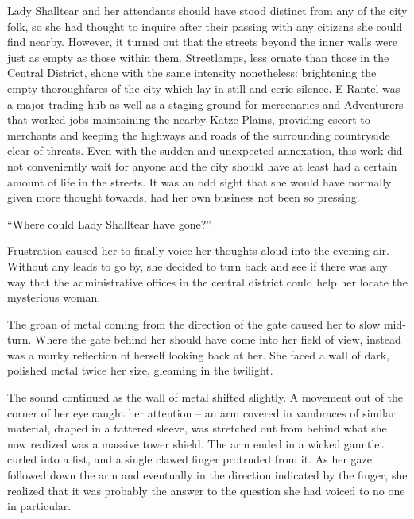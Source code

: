  

Lady Shalltear and her attendants should have stood distinct from any of the city folk, so she had thought to inquire after their passing with any citizens she could find nearby. However, it turned out that the streets beyond the inner walls were just as empty as those within them. Streetlamps, less ornate than those in the Central District, shone with the same intensity nonetheless: brightening the empty thoroughfares of the city which lay in still and eerie silence. E-Rantel was a major trading hub as well as a staging ground for mercenaries and Adventurers that worked jobs maintaining the nearby Katze Plains, providing escort to merchants and keeping the highways and roads of the surrounding countryside clear of threats. Even with the sudden and unexpected annexation, this work did not conveniently wait for anyone and the city should have at least had a certain amount of life in the streets. It was an odd sight that she would have normally given more thought towards, had her own business not been so pressing.

 

“Where could Lady Shalltear have gone?”

 

Frustration caused her to finally voice her thoughts aloud into the evening air. Without any leads to go by, she decided to turn back and see if there was any way that the administrative offices in the central district could help her locate the mysterious woman.

 

The groan of metal coming from the direction of the gate caused her to slow mid-turn. Where the gate behind her should have come into her field of view, instead was a murky reflection of herself looking back at her. She faced a wall of dark, polished metal twice her size, gleaming in the twilight.

 

The sound continued as the wall of metal shifted slightly. A movement out of the corner of her eye caught her attention – an arm covered in vambraces of similar material, draped in a tattered sleeve, was stretched out from behind what she now realized was a massive tower shield. The arm ended in a wicked gauntlet curled into a fist, and a single clawed finger protruded from it. As her gaze followed down the arm and eventually in the direction indicated by the finger, she realized that it was probably the answer to the question she had voiced to no one in particular.

